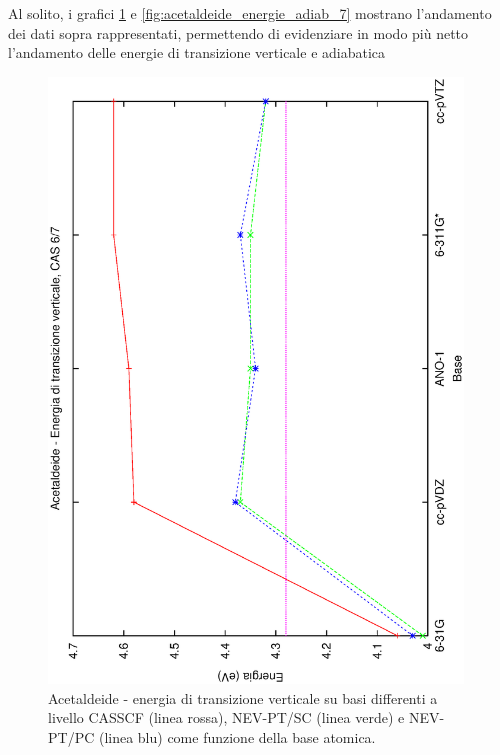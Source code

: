 Al solito, i grafici \ref{fig:acetaldeide_energie_vert_7} e \ref{fig:acetaldeide_energie_adiab_7}
mostrano l'andamento dei dati sopra rappresentati, permettendo di
evidenziare in modo pi\`u netto l'andamento delle energie di transizione
verticale e adiabatica
\begin{figure}[ht]
\begin{center}
\includegraphics[angle=270,width=11cm,keepaspectratio]{immagini/acetaldeide/energie_vert_7.eps}
\parbox[h]{12cm}{
\caption{\small Acetaldeide - energia di transizione verticale su basi differenti a livello CASSCF (linea rossa), NEV-PT/SC (linea verde) e NEV-PT/PC (linea blu) come funzione della base atomica.}
\label{fig:acetaldeide_energie_vert_7}
}
\end{center}
\end{figure}
\pagebreak
